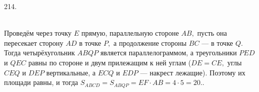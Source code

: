 \documentclass[12pt]{article}
\begin{document}
214. \begin{figure}[ht!]
\end{figure}\\
Проведём через точку $E$ прямую, параллельную стороне $AB,$ пусть она пересекает сторону $AD$ в точке $P,$ а продолжение стороны $BC$ --- в точке $Q.$ Тогда четырёхугольник $ABQP$ является параллелограммом, а треугольники $PED$ и $QEC$ равны по стороне и двум прилежащим к ней углам ($DE=CE,$ углы $CEQ$ и $DEP$ вертикальные, а $ECQ$ и $EDP$ --- накрест лежащие). Поэтому их площади равны, и тогда $S_{ABCD}=S_{ABQP}=EF\cdot AB=4\cdot5=20.$\newpage{}. \begin{figure}[ht!]
\end{figure}\\
\end{document}
